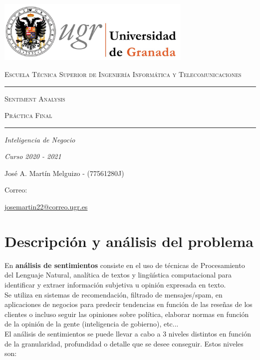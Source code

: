 \documentclass[a4paper,12pt]{report}
\begin{document}
\begin{titlepage}
    \centering
    {\includegraphics[width=0.7\textwidth]{images/ugr.jpeg}\par}
    \vspace{1cm}
    {\scshape\Large Escuela Técnica Superior de Ingeniería Informática y Telecomunicaciones \par}
    \vspace{2.5cm}
    \hrule height 0.5pt
    \vspace{0.5cm}
    {\scshape\Huge Sentiment Analysis \par}
    \vspace{1cm}
    {\scshape\large Práctica Final \par}
    \vspace{0.5cm}
    \hrule height 0.5pt
    \vspace{4cm}
    {\itshape\Large Inteligencia de Negocio \par}
    \vspace{0.2cm}
    {\itshape\Large Curso 2020 - 2021 \par}
    \vfill
    {\Large José A. Martín Melguizo - (77561280J) \par}
    \vspace{0.5cm}
    {\large Correo:} {\href{correo}{josemartin22@correo.ugr.es} \par}
    \vfill
    
\end{titlepage}


\clearpage
\tableofcontents
\clearpage

\chapter{Descripción y análisis del problema}

En \textbf{análisis de sentimientos} consiste en el uso de técnicas de Procesamiento del Lenguaje Natural, analítica de textos y lingüística computacional para identificar y extraer información subjetiva u opinión expresada en texto. 
\vspace{2mm}\\
Se utiliza en sistemas de recomendación, filtrado de mensajes/spam, en aplicaciones de negocios para predecir tendencias en función de las reseñas de los clientes o incluso seguir las opiniones sobre política, elaborar normas en función de la opinión de la gente (inteligencia de gobierno), etc...
\vspace{2mm}\\
El análisis de sentimientos se puede llevar a cabo a 3 niveles distintos en función de la granularidad, profundidad o detalle que se desee conseguir. Estos niveles son:
\end{document}
